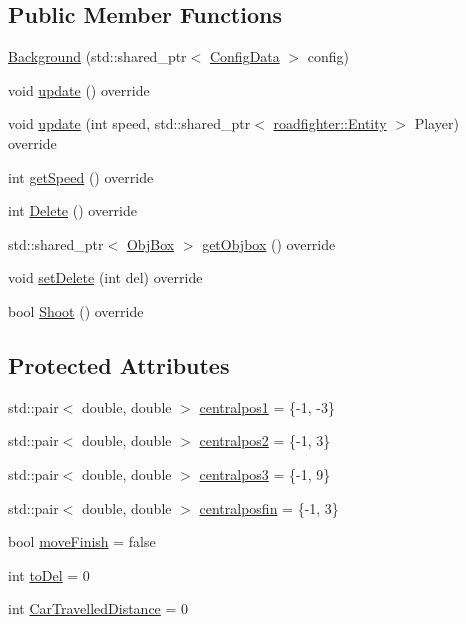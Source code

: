 \subsection*{Public Member Functions}
\begin{DoxyCompactItemize}
\item 
\hyperlink{classroadfighter_1_1Background_a7b01984ecdbd0ec7e2d2d9962463f663}{Background} (std\+::shared\+\_\+ptr$<$ \hyperlink{classConfigData}{Config\+Data} $>$ config)
\item 
void \hyperlink{classroadfighter_1_1Background_a6fa762ca6aa2f18918c1b715ae94395f}{update} () override
\item 
void \hyperlink{classroadfighter_1_1Background_a881ed4d9e98e86ce7128c0fd18f82160}{update} (int speed, std\+::shared\+\_\+ptr$<$ \hyperlink{classroadfighter_1_1Entity}{roadfighter\+::\+Entity} $>$ Player) override
\item 
int \hyperlink{classroadfighter_1_1Background_acbeaa8438617d67f8069347000e185a1}{get\+Speed} () override
\item 
int \hyperlink{classroadfighter_1_1Background_a6541d509079dfa940d9f7ec2ab706963}{Delete} () override
\item 
std\+::shared\+\_\+ptr$<$ \hyperlink{structObjBox}{Obj\+Box} $>$ \hyperlink{classroadfighter_1_1Background_af25322839a52bc232266cceb2a85dd7d}{get\+Objbox} () override
\item 
void \hyperlink{classroadfighter_1_1Background_acb4cdc56872d164b297b5655124df54d}{set\+Delete} (int del) override
\item 
bool \hyperlink{classroadfighter_1_1Background_a1482152bca4207b44f1ce1c2c5af5847}{Shoot} () override
\end{DoxyCompactItemize}
\subsection*{Protected Attributes}
\begin{DoxyCompactItemize}
\item 
std\+::pair$<$ double, double $>$ \hyperlink{classroadfighter_1_1Background_a490223cc4c2fe332df45506a26bc48ba}{centralpos1} = \{-\/1, -\/3\}
\item 
std\+::pair$<$ double, double $>$ \hyperlink{classroadfighter_1_1Background_a5acc0e95972469cf195057e862e88b1a}{centralpos2} = \{-\/1, 3\}
\item 
std\+::pair$<$ double, double $>$ \hyperlink{classroadfighter_1_1Background_a756bfd2a4af29498e9796b73cde5cbf3}{centralpos3} = \{-\/1, 9\}
\item 
std\+::pair$<$ double, double $>$ \hyperlink{classroadfighter_1_1Background_a63c941e322b2f9113c61c1d5f07d5912}{centralposfin} = \{-\/1, 3\}
\item 
bool \hyperlink{classroadfighter_1_1Background_a7e8171af25b6b6aadc8a256bf360b351}{move\+Finish} = false
\item 
int \hyperlink{classroadfighter_1_1Background_a90c142a5d66d6e261bf33f6037b4f77d}{to\+Del} = 0
\item 
int \hyperlink{classroadfighter_1_1Background_a084a46a73deb42183773dfd29adbc106}{Car\+Travelled\+Distance} = 0
\end{DoxyCompactItemize}


